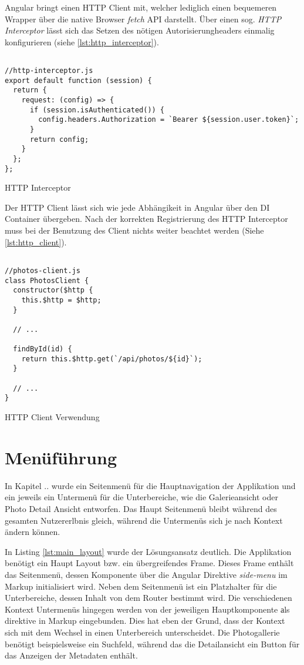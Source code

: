 Angular bringt einen HTTP Client mit, welcher lediglich einen bequemeren Wrapper über die native Browser \textit{fetch} API darstellt. Über einen sog. \textit{HTTP Interceptor} lässt sich das Setzen des nötigen Autorisierungheaders einmalig konfigurieren (siehe \ref{lst:http_interceptor}).

\begin{listing}[H]
\begin{verbatim}

//http-interceptor.js
export default function (session) {
  return {
    request: (config) => {
      if (session.isAuthenticated()) {
        config.headers.Authorization = `Bearer ${session.user.token}`;
      }
      return config;
    }
  };
};

\end{verbatim}
\caption{HTTP Interceptor}
\label{lst:http_interceptor}
\end{listing}

Der HTTP Client lässt sich wie jede Abhängikeit in Angular über den DI Container übergeben. Nach der korrekten Registrierung des HTTP Interceptor muss bei der Benutzung des Client nichts weiter beachtet werden (Siehe \ref{lst:http_client}).

\begin{listing}[H]
\begin{verbatim}

//photos-client.js
class PhotosClient {
  constructor($http {
    this.$http = $http;
  }

  // ...

  findById(id) {
    return this.$http.get(`/api/photos/${id}`);
  }

  // ...
}  

\end{verbatim}
\caption{HTTP Client Verwendung}
\label{lst:http_client}
\end{listing} 

\section{Menüführung}

In Kapitel .. wurde ein Seitenmenü für die Hauptnavigation der Applikation und ein jeweils ein Untermenü für die Unterbereiche, wie die Galerieansicht oder Photo Detail Ansicht entworfen. Das Haupt Seitenmenü bleibt während des gesamten Nutzererlbnis gleich, während die Untermenüs sich je nach Kontext ändern können.

In Listing \ref{lst:main_layout} wurde der Lösungsansatz deutlich. Die Applikation benötigt ein Haupt Layout bzw. ein übergreifendes Frame. Dieses Frame enthält das Seitenmenü, dessen Komponente über die Angular Direktive \textit{side-menu} im Markup initialisiert wird. Neben dem Seitenmenü ist ein Platzhalter für die Unterbereiche, dessen Inhalt von dem Router bestimmt wird. Die verschiedenen Kontext Untermenüs hingegen werden von der jeweiligen Hauptkomponente аls direktive in Markup eingebunden. Dies hat eben der Grund, dass der Kontext sich mit dem Wechsel in einen Unterbereich unterscheidet. Die Photogallerie benötigt beispielsweise ein Suchfeld, während das die Detailansicht ein Button für das Anzeigen der Metadaten enthält.

